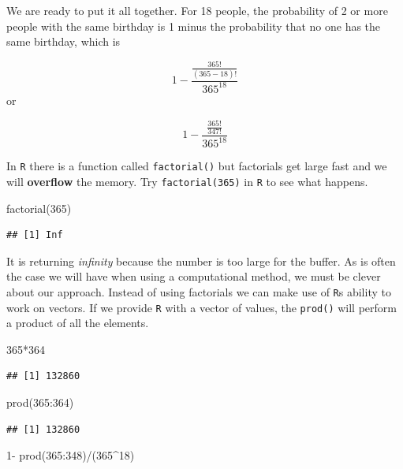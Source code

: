 \documentclass[
]{book}
\newenvironment{Shaded}{\begin{snugshade}}{\end{snugshade}}
\newcommand{\DecValTok}[1]{\textcolor[rgb]{0.00,0.00,0.81}{#1}}
\newcommand{\FunctionTok}[1]{\textcolor[rgb]{0.00,0.00,0.00}{#1}}
\newcommand{\NormalTok}[1]{#1}
\newcommand{\SpecialCharTok}[1]{\textcolor[rgb]{0.00,0.00,0.00}{#1}}
\begin{document}
We are ready to put it all together. For 18 people, the probability of 2 or more people with the same birthday is 1 minus the probability that no one has the same birthday, which is

\[1 - \frac{\frac{365!}{(365-18)!}}{365^{18}}\] or

\[1 - \frac{\frac{365!}{347!}}{365^{18}}\]

In \texttt{R} there is a function called \texttt{factorial()} but factorials get large fast and we will \textbf{overflow} the memory. Try \texttt{factorial(365)} in \texttt{R} to see what happens.

\begin{Shaded}
\begin{Highlighting}[]
\FunctionTok{factorial}\NormalTok{(}\DecValTok{365}\NormalTok{)}
\end{Highlighting}
\end{Shaded}

\begin{verbatim}
## [1] Inf
\end{verbatim}

It is returning \emph{infinity} because the number is too large for the buffer. As is often the case we will have when using a computational method, we must be clever about our approach. Instead of using factorials we can make use of \texttt{R}s ability to work on vectors. If we provide \texttt{R} with a vector of values, the \texttt{prod()} will perform a product of all the elements.

\begin{Shaded}
\begin{Highlighting}[]
\DecValTok{365}\SpecialCharTok{*}\DecValTok{364}
\end{Highlighting}
\end{Shaded}

\begin{verbatim}
## [1] 132860
\end{verbatim}

\begin{Shaded}
\begin{Highlighting}[]
\FunctionTok{prod}\NormalTok{(}\DecValTok{365}\SpecialCharTok{:}\DecValTok{364}\NormalTok{)}
\end{Highlighting}
\end{Shaded}

\begin{verbatim}
## [1] 132860
\end{verbatim}

\begin{Shaded}
\begin{Highlighting}[]
\DecValTok{1}\SpecialCharTok{{-}} \FunctionTok{prod}\NormalTok{(}\DecValTok{365}\SpecialCharTok{:}\DecValTok{348}\NormalTok{)}\SpecialCharTok{/}\NormalTok{(}\DecValTok{365}\SpecialCharTok{\^{}}\DecValTok{18}\NormalTok{)}
\end{Highlighting}
\end{Shaded}
\end{document}
